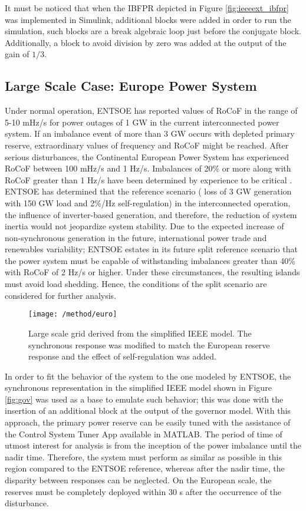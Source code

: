 It must be noticed that when the IBFPR depicted in Figure \ref{fig:ieeeext_ibfpr} was implemented in Simulink, additional blocks were added in order to run the simulation, such blocks are a break algebraic loop just before the conjugate block. Additionally, a block to avoid division by zero was added at the output of the gain of $ 1 /3 $.

\subsection{Large Scale Case: Europe Power System}

Under normal operation, ENTSOE has reported values of RoCoF in the range of 5-10 mHz/s for power outages of 1 GW in the current interconnected power system. If an imbalance event of more than 3 GW occurs with depleted primary reserve, extraordinary values of frequency and RoCoF might be reached. After serious disturbances, the Continental European Power System has experienced RoCoF between 100 mHz/s and 1 Hz/s. Imbalances of 20\% or more along with RoCoF greater than 1 Hz/s have been determined by experience to be critical \cite{ENTSOE.2016}. ENTSOE has determined that the reference scenario ( loss of 3 GW generation with 150 GW load and 2\%/Hz self-regulation) in the interconnected operation, the influence of inverter-based generation, and therefore, the reduction of system inertia would not jeopardize system stability. Due to the expected increase of non-synchronous generation in the future, international power trade and renewables variability; ENTSOE estates in its future split reference scenario that the power system must be capable of withstanding imbalances greater than 40\% with RoCoF of 2 Hz/s or higher. Under these circumstances, the resulting islands must avoid load shedding. Hence, the conditions of the split scenario are considered for further analysis.
\begin{figure}[h]
\centering
\texttt{[image: /method/euro]}
\caption{Large scale grid derived from the simplified IEEE model. The synchronous response was modified to match the European reserve response and the effect of self-regulation was added.}
\label{fig:euro}
\end{figure}

In order to fit the behavior of the system to the one modeled by ENTSOE, the synchronous representation in the simplified IEEE model shown in Figure \ref{fig:gov} was used as a base to emulate such behavior; this was done with the insertion of an additional block at the output of the governor model. With this approach, the primary power reserve can be easily tuned with the assistance of the Control System Tuner App available in MATLAB. The period of time of utmost interest for analysis is from the inception of the power imbalance until the nadir time. Therefore, the system must perform as similar as possible in this region compared to the ENTSOE reference, whereas after the nadir time, the disparity between responses can be neglected. On the European scale, the reserves must be completely deployed within 30 s after the occurrence of the disturbance.

